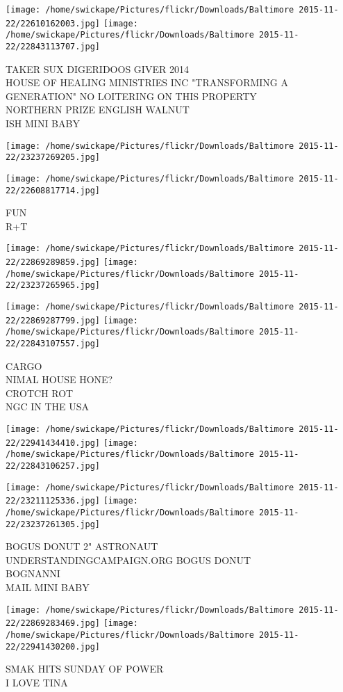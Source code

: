 \documentclass[10pt,letterpaper]{article}
\begin{document}
\texttt{[image: /home/swickape/Pictures/flickr/Downloads/Baltimore 2015-11-22/22610162003.jpg]}
\texttt{[image: /home/swickape/Pictures/flickr/Downloads/Baltimore 2015-11-22/22843113707.jpg]}

TAKER SUX DIGERIDOOS GIVER 2014\\
HOUSE OF HEALING MINISTRIES INC "TRANSFORMING A GENERATION" NO LOITERING ON THIS PROPERTY\\
NORTHERN PRIZE ENGLISH WALNUT\\
ISH MINI BABY\\
\pagebreak

\texttt{[image: /home/swickape/Pictures/flickr/Downloads/Baltimore 2015-11-22/23237269205.jpg]}

\vspace{0.25in}
\texttt{[image: /home/swickape/Pictures/flickr/Downloads/Baltimore 2015-11-22/22608817714.jpg]}

FUN\\
R+T\\
\pagebreak

\texttt{[image: /home/swickape/Pictures/flickr/Downloads/Baltimore 2015-11-22/22869289859.jpg]}
\texttt{[image: /home/swickape/Pictures/flickr/Downloads/Baltimore 2015-11-22/23237265965.jpg]}

\texttt{[image: /home/swickape/Pictures/flickr/Downloads/Baltimore 2015-11-22/22869287799.jpg]}
\texttt{[image: /home/swickape/Pictures/flickr/Downloads/Baltimore 2015-11-22/22843107557.jpg]}

CARGO\\
NIMAL HOUSE HONE?\\
CROTCH ROT\\
NGC IN THE USA\\
\pagebreak

\texttt{[image: /home/swickape/Pictures/flickr/Downloads/Baltimore 2015-11-22/22941434410.jpg]}
\texttt{[image: /home/swickape/Pictures/flickr/Downloads/Baltimore 2015-11-22/22843106257.jpg]}

\texttt{[image: /home/swickape/Pictures/flickr/Downloads/Baltimore 2015-11-22/23211125336.jpg]}
\texttt{[image: /home/swickape/Pictures/flickr/Downloads/Baltimore 2015-11-22/23237261305.jpg]}

BOGUS DONUT 2" ASTRONAUT\\
UNDERSTANDINGCAMPAIGN.ORG BOGUS DONUT\\
BOGNANNI\\
MAIL MINI BABY\\
\pagebreak

\texttt{[image: /home/swickape/Pictures/flickr/Downloads/Baltimore 2015-11-22/22869283469.jpg]}
\texttt{[image: /home/swickape/Pictures/flickr/Downloads/Baltimore 2015-11-22/22941430200.jpg]}

SMAK HITS SUNDAY OF POWER\\
I LOVE TINA\\
\pagebreak
\end{document}
